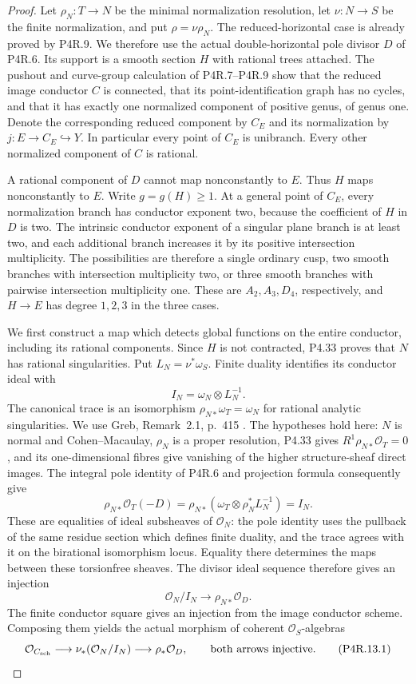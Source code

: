 \begin{proof}
Let $\rho_N:T\to N$ be the minimal normalization resolution,
let $\nu:N\to S$ be the finite normalization, and put
$\rho=\nu\rho_N$. The reduced-horizontal case is already
proved by P4R.9. We therefore use the actual double-horizontal
pole divisor $D$ of P4R.6. Its support is a smooth section $H$
with rational trees attached. The pushout and curve-group
calculation of P4R.7--P4R.9 show that the reduced image
conductor $C$ is connected, that its point-identification
graph has no cycles, and that it has exactly one normalized
component of positive genus, of genus one. Denote the
corresponding reduced component by $C_E$ and its normalization
by $j:E\to C_E\hookrightarrow Y$. In particular every point
of $C_E$ is unibranch. Every other normalized component of
$C$ is rational.

A rational component of $D$ cannot map nonconstantly to $E$.
Thus $H$ maps nonconstantly to $E$. Write $g=g(H)\ge1$.
At a general point of $C_E$, every normalization branch has
conductor exponent two, because the coefficient of $H$ in
$D$ is two. The intrinsic conductor exponent of a singular
plane branch is at least two, and each additional branch
increases it by its positive intersection multiplicity.
The possibilities are therefore a single ordinary cusp,
two smooth branches with intersection multiplicity two, or
three smooth branches with pairwise intersection multiplicity
one. These are $A_2,A_3,D_4$, respectively, and $H\to E$
has degree $1,2,3$ in the three cases.

We first construct a map which detects global functions on
the entire conductor, including its rational components.
Since $H$ is not contracted, P4.33 proves that $N$ has
rational singularities. Put $L_N=\nu^*\omega_S$.
Finite duality identifies its conductor ideal with
\[
 I_N=\omega_N\otimes L_N^{-1}.
\]
The canonical trace is an isomorphism
$\rho_{N*}\omega_T=\omega_N$ for rational analytic
singularities. We use Greb, Remark~2.1, p.~415
\cite{Greb2011}. The hypotheses hold here: $N$ is normal
and Cohen--Macaulay, $\rho_N$ is a proper resolution,
P4.33 gives $R^1\rho_{N*}\mathcal O_T=0$, and its
one-dimensional fibres give vanishing of the higher
structure-sheaf direct images. The integral pole identity
of P4R.6 and projection formula consequently give
\[
 \rho_{N*}\mathcal O_T(-D)
 =\rho_{N*}(\omega_T\otimes\rho_N^*L_N^{-1})
 =I_N.
\]
These are equalities of ideal subsheaves of $\mathcal O_N$:
the pole identity uses the pullback of the same residue
section which defines finite duality, and the trace agrees
with it on the birational isomorphism locus. Equality there
determines the maps between these torsionfree sheaves.
The divisor ideal sequence therefore gives an injection
\[
 \mathcal O_N/I_N\longrightarrow\rho_{N*}\mathcal O_D.
\]
The finite conductor square gives an injection from the
image conductor scheme. Composing them yields the actual
morphism of coherent $\mathcal O_S$-algebras
\[
 \mathcal O_{C_{\rm sch}}\longrightarrow
 \nu_*(\mathcal O_N/I_N)\longrightarrow\rho_*\mathcal O_D,
 \qquad\hbox{both arrows injective}.                         \tag{P4R.13.1}
\]


\end{proof}
